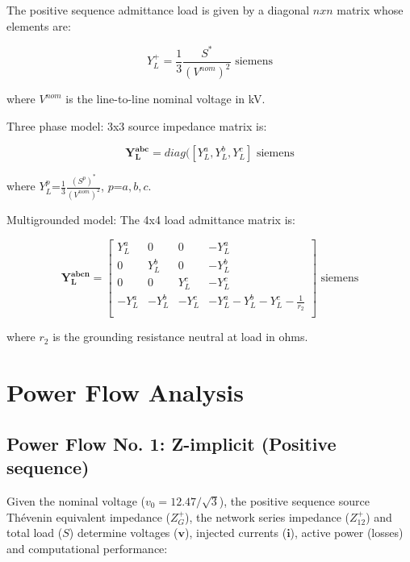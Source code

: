 \documentclass[12pt]{article}
\begin{document}
The positive sequence admittance load is given by a diagonal $n x n$ matrix whose elements are:

\begin{equation}
{Y}^{+}_{L}=\frac{1}{3}\frac{{S}^*}{(V^{nom})^2}\mbox{ siemens}
\end{equation}

where $V^{nom}$ is the line-to-line nominal voltage in kV.


Three phase model: 3x3 source impedance matrix is:

\begin{equation}
\mathbf{Y^{abc}_{L}}=diag([{Y}^a_{L},{Y}^b_{L},{Y}^c_{L}]\mbox{ siemens}
\end{equation}

where ${Y}^p_{L}$=$\frac{1}{3}\frac{({S}^p)^*}{(V^{nom})^2}$, $p$=$a,b,c$.

Multigrounded model: The 4x4 load admittance matrix is:

\begin{equation}
\mathbf{Y^{abcn}_{L}}=\left[ \begin{array}{cccc}
               {Y}^{a}_{L} &0  &0 & -{Y}^{a}_{L}\\
              0 & {Y}^{b}_{L}  &0 & -{Y}^{b}_{L}\\
               0 &0  &{Y}^{c}_{L} & -{Y}^{c}_{L}\\
               -{Y}^{a}_{L} & -{Y}^{b}_{L}  &-{Y}^{c}_{L} & -{Y}^{a}_{L}-{Y}^{b}_{L}-{Y}^{c}_{L}-\frac{1}{r_2}\\
             \end{array}
           \right] \mbox{ siemens}\end{equation}

where $r_2$ is the grounding resistance neutral at load in ohms.

\section{Power Flow Analysis}

\subsection{Power Flow No. 1: Z-implicit (Positive sequence)}

Given the nominal voltage ($v_0=12.47/\sqrt{3}$), the positive sequence source Th\'evenin equivalent impedance (${Z}^{+}_{G}$), the network series impedance (${Z}^{+}_{12}$) and total load (${S}$)
determine voltages ($\bm{v}$), injected currents ($\mathbf{i}$), active power (losses) and computational performance:
\end{document}
